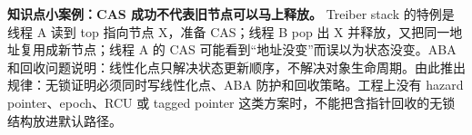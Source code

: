 \begin{casebox}
\textbf{知识点小案例：CAS 成功不代表旧节点可以马上释放。}
Treiber stack 的特例是线程 A 读到 top 指向节点 X，准备 CAS；线程 B pop 出 X 并释放，又把同一地址复用成新节点；线程 A 的 CAS 可能看到“地址没变”而误以为状态没变。ABA 和回收问题说明：线性化点只解决状态更新顺序，不解决对象生命周期。由此推出规律：无锁证明必须同时写线性化点、ABA 防护和回收策略。工程上没有 hazard pointer、epoch、RCU 或 tagged pointer 这类方案时，不能把含指针回收的无锁结构放进默认路径。
\end{casebox}
